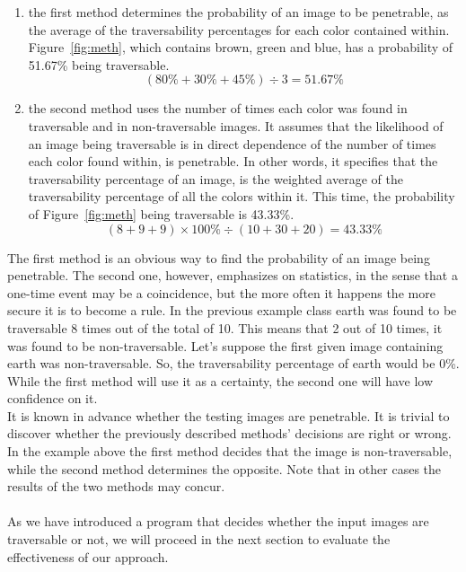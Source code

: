 \documentclass[12pt,a4paper,table,dvipsnames,tikz]{report}
\newcommand{\bl}[1]{{\hypersetup{linkcolor=blue}#1}}
\begin{document}
	\begin{enumerate}
		\item the first method determines the probability of an image to be penetrable, 
		as the average of the traversability percentages for each color contained within.
		Figure~\bl{\ref{fig:meth}}, which contains brown, green and blue, has a probability 
		of 51.67\% being traversable.
		\[ (80\% + 30\% + 45\%) \div 3 = 51.67\% \]
		\item the second method uses the number of times each color was found in traversable 
		and in non-traversable images. It assumes that the likelihood of an image being 
		traversable is in direct dependence of the number of times each color found within, 
		is penetrable. In other words, it specifies that the traversability percentage of 
		an image, is the weighted average of the traversability percentage of all the colors 
		within it. 
		This time, the probability of Figure~\bl{\ref{fig:meth}} being traversable is 43.33\%.
		\[ (8 + 9 + 9) \times 100\% \div (10 + 30 + 20) = 43.33\% \]
	\end{enumerate}
	
	The first method is an obvious way to find the probability of an image being penetrable. 
	The second one, however, emphasizes on statistics, in the sense that a one-time event  
	may be a coincidence, but the more often it happens the more secure it is to become 
	a rule. In the previous example class earth was found to be traversable 8 times out 
	of the total of 10. This means that 2 out of 10 times, it was found to be non-traversable. 
	Let's suppose the first given image containing earth was non-traversable. So, the 
	traversability percentage of earth would be 0\%. While the first method will use it 
	as a certainty, the second one will have low confidence on it.
	\\
	
	It is known in advance whether the testing images are penetrable. It is trivial to 
	discover whether the previously described methods’ decisions are right or wrong.
	In the example above the first method decides that the image is non-traversable, 
	while the second method determines the opposite. Note that in other cases the 
	results of the two methods may concur.
	\\\\ 
	
	
	As we have introduced a program that decides whether the input images are traversable 
	or not, we will proceed in the next section to evaluate the effectiveness of our 
	approach.
	\\
	
\end{document}

